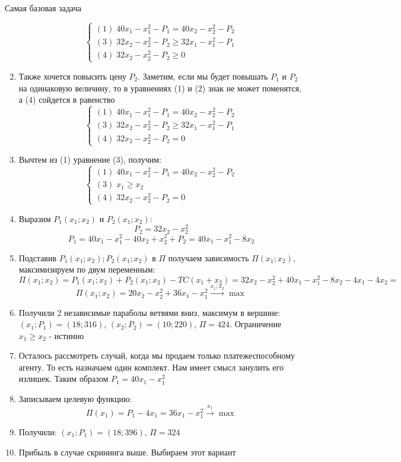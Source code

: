 \begin{mybox}{Самая базовая задача}
\begin{enumerate}
\begin{equation*}
\begin{cases}
           (1)\;40x_1-x_1^2-P_1= 40x_2-x_2^2-P_2
           \\
           (3)\;32x_2-x_2^2-P_2\geq 32x_1-x_1^2-P_1
           \\
           (4)\;32x_2-x_2^2-P_2\geq 0
         \end{cases}
        \end{equation*}
        \item Также хочется повысить цену $P_2$. Заметим, если мы будет повышать $P_1$ и $P_2$ на одинаковую величину, то в уравнениях (1) и (2) знак не может поменятся, а (4) сойдется в равенство
        \begin{equation*}
         \begin{cases}
           (1)\;40x_1-x_1^2-P_1= 40x_2-x_2^2-P_2
           \\
           (3)\;32x_2-x_2^2-P_2\geq 32x_1-x_1^2-P_1
           \\
           (4)\;32x_2-x_2^2-P_2= 0
         \end{cases}
        \end{equation*}
        \item Вычтем из (1) уравнение (3), получим:
        \begin{equation*}
         \begin{cases}
           (1)\;40x_1-x_1^2-P_1= 40x_2-x_2^2-P_2
           \\
           (3)\;x_1\geq x_2
           \\
           (4)\;32x_2-x_2^2-P_2= 0
         \end{cases}
        \end{equation*}
        \item Выразим $P_1(x_1;x_2)$ и $P_2(x_1;x_2)$:
        $$P_2=32x_2-x_2^2$$
        $$P_1=40x_1-x_1^2-40x_2+x_2^2+P_2=40x_1-x_1^2-8x_2$$
        \item Подставив $P_1(x_1;x_2);P_2(x_1;x_2)$ в $\Pi$ получаем зависимость $\Pi(x_1;x_2)$, максимизируем по двум переменным:
        $$\Pi(x_1;x_2)=P_1(x_1;x_2)+P_2(x_1;x_2)-TC(x_1+x_2)=32x_2-x_2^2+40x_1-x_1^2-8x_2-4x_1-4x_2=$$
        $$\Pi(x_1;x_2)=20x_2-x_2^2+36x_1-x_1^2\xrightarrow{x_1;x_2} \max$$
        \item Получили 2 независимые параболы ветвями вниз, максимум в вершине: $(x_1;P_1)=(18;316)$, $(x_2;P_2)=(10;220)$, $\Pi=424$. Ограничение $x_1\geq x_2$ - истинно
        \item Осталось рассмотреть случай, когда мы продаем только платежеспособному агенту. То есть назначаем один комплект. Нам имеет смысл занулить его излишек. Таким образом $P_1=40x_1-x_1^2$
        \item Записываем целевую функцию: $$\Pi(x_1)=P_1-4x_1=36x_1-x_1^2 \xrightarrow{x_1} \max$$
        \item Получили: $(x_1;P_1)=(18;396)$, $\Pi=324$
        \item Прибыль в случае скрининга выше. Выбираем этот вариант
    \end{enumerate}
\end{mybox}

